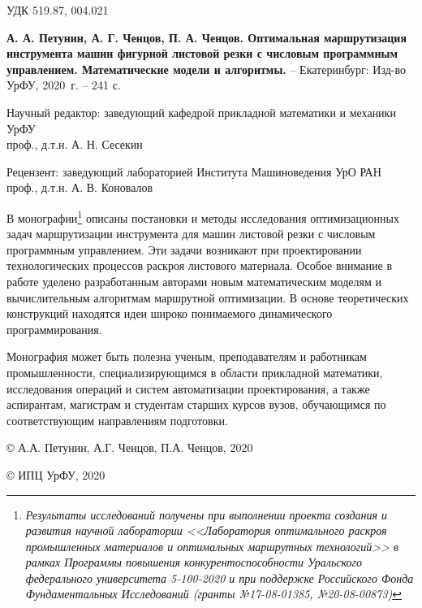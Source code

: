
\thispagestyle{empty}
{
\setlength{\parindent}{0pt}
\setlength{\parskip}{1em}
\footnotesize

\noindent
УДК 519.87, 004.021

\vspace{3em}

{\bf
А. А. Петунин,
А. Г. Ченцов,
П. А. Ченцов.
Оптимальная маршрутизация инструмента машин фигурной листовой резки
с числовым программным управлением.
Математические модели и алгоритмы.
}
--
Екатеринбург:
Изд-во УрФУ,
2020~г.
--
241 с.

\vspace{3em}

\begin{center}

Научный редактор:
заведующий кафедрой прикладной математики и механики УрФУ
\\
проф., д.т.н. А. Н. Сесекин

Рецензент:
заведующий лабораторией Института Машиноведения УрО РАН
\\
проф., д.т.н. А. В. Коновалов
\end{center}

\vspace{3em}

В монографии\footnote{\it
  Результаты исследований получены при выполнении
  проекта создания и развития научной лаборатории
  <<Лаборатория оптимального раскроя промышленных материалов
  и оптимальных маршрутных технологий>>
  в рамках Программы повышения конкурентоспособности
  Уральского федерального университета
  5-100-2020
  и при поддержке Российского Фонда Фундаментальных Исследований
  (гранты №17-08-01385, №20-08-00873)
}
описаны постановки и методы исследования оптимизационных задач
маршрутизации инструмента для машин листовой резки
с числовым программным управлением.
Эти задачи возникают при проектировании технологических процессов
раскроя листового материала.
Особое внимание в работе уделено разработанным авторами
новым математическим моделям и вычислительным алгоритмам маршрутной оптимизации.
В основе теоретических конструкций находятся идеи
широко понимаемого динамического программирования.

Монография может быть полезна ученым, преподавателям и работникам промышленности,
специализирующимся в области прикладной математики,
исследования операций и систем автоматизации проектирования,
а также аспирантам, магистрам и студентам старших курсов вузов,
обучающимся по соответствующим направлениям подготовки.

\vspace{3em}
{
\setlength{\parindent}{0.5\linewidth}
\setlength{\parskip}{0em}
\scriptsize

\copyright
А.А. Петунин, А.Г. Ченцов, П.А. Ченцов, 2020

\copyright
ИПЦ УрФУ, 2020
}}
